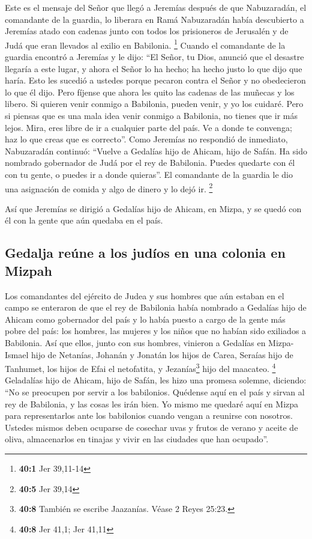  Este es el mensaje del Señor que llegó a Jeremías después
de que Nabuzaradán, el comandante de la guardia, lo liberara en Ramá
Nabuzaradán había descubierto a Jeremías atado con cadenas junto con
todos los prisioneros de Jerusalén y de Judá que eran llevados al exilio
en Babilonia. \footnote{\textbf{40:1} Jer 39,11-14} 
Cuando el comandante de la guardia encontró a Jeremías y le dijo: ``El
Señor, tu Dios, anunció que el desastre llegaría a este lugar,
 y ahora el Señor lo ha hecho; ha hecho justo lo que dijo
que haría. Esto les sucedió a ustedes porque pecaron contra el Señor y
no obedecieron lo que él dijo.  Pero fíjense que ahora les
quito las cadenas de las muñecas y los libero. Si quieren venir conmigo
a Babilonia, pueden venir, y yo los cuidaré. Pero si piensas que es una
mala idea venir conmigo a Babilonia, no tienes que ir más lejos. Mira,
eres libre de ir a cualquier parte del país. Ve a donde te convenga; haz
lo que creas que es correcto''.  Como Jeremías no
respondió de inmediato, Nabuzaradán continuó: ``Vuelve a Gedalías hijo
de Ahicam, hijo de Safán. Ha sido nombrado gobernador de Judá por el rey
de Babilonia. Puedes quedarte con él con tu gente, o puedes ir a donde
quieras''. El comandante de la guardia le dio una asignación de comida y
algo de dinero y lo dejó ir. \footnote{\textbf{40:5} Jer 39,14}

 Así que Jeremías se dirigió a Gedalías hijo de Ahicam, en
Mizpa, y se quedó con él con la gente que aún quedaba en el país.

\hypertarget{gedalja-reuxfane-a-los-juduxedos-en-una-colonia-en-mizpah}{%
\subsection{Gedalja reúne a los judíos en una colonia en
Mizpah}\label{gedalja-reuxfane-a-los-juduxedos-en-una-colonia-en-mizpah}}

 Los comandantes del ejército de Judea y sus hombres que
aún estaban en el campo se enteraron de que el rey de Babilonia había
nombrado a Gedalías hijo de Ahicam como gobernador del país y lo había
puesto a cargo de la gente más pobre del país: los hombres, las mujeres
y los niños que no habían sido exiliados a Babilonia.  Así
que ellos, junto con sus hombres, vinieron a Gedalías en Mizpa-Ismael
hijo de Netanías, Johanán y Jonatán los hijos de Carea, Seraías hijo de
Tanhumet, los hijos de Efai el netofatita, y Jezanías\footnote{\textbf{40:8}
  También se escribe Jaazanías. Véase 2 Reyes 25:23.} hijo del maacateo.
\footnote{\textbf{40:8} Jer 41,1; Jer 41,11}  Geladalías
hijo de Ahicam, hijo de Safán, les hizo una promesa solemne, diciendo:
``No se preocupen por servir a los babilonios. Quédense aquí en el país
y sirvan al rey de Babilonia, y las cosas les irán bien. 
Yo mismo me quedaré aquí en Mizpa para representarlos ante los
babilonios cuando vengan a reunirse con nosotros. Ustedes mismos deben
ocuparse de cosechar uvas y frutos de verano y aceite de oliva,
almacenarlos en tinajas y vivir en las ciudades que han ocupado''.

